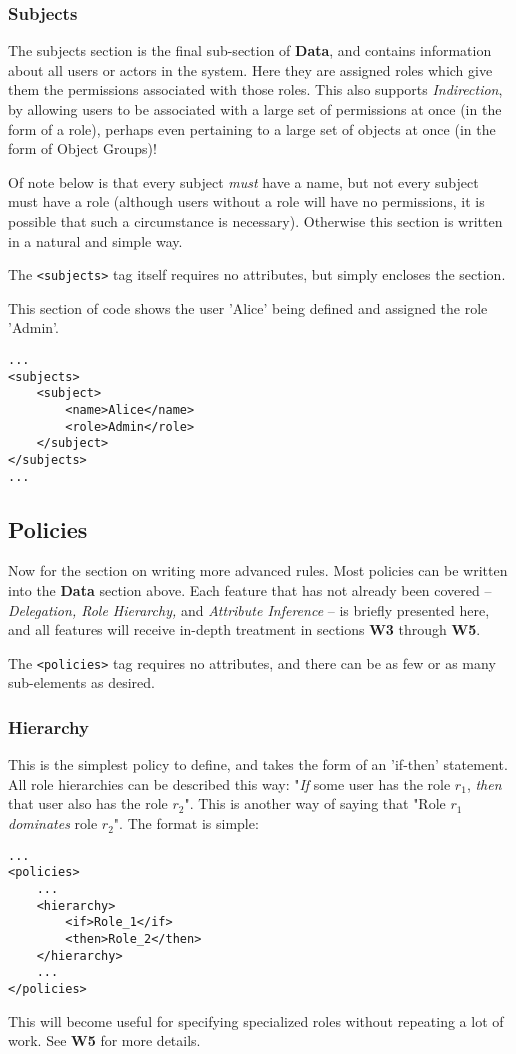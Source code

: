 \documentclass{article}
\providecommand{\inlinecode}{\texttt}
\begin{document}
\subsubsection{Subjects}
The subjects section is the final sub-section of \textbf{Data}, and contains information about all users or actors in the system. Here they are assigned roles which give them the permissions associated with those roles.
This also supports \textit{Indirection}, by allowing users to be associated with a large set of permissions at once (in the form of a role), perhaps even pertaining to a large set of objects at once (in the form of Object Groups)! \par
Of note below is that every subject \textit{must} have a name, but not every subject must have a role (although users without a role will have no permissions, it is possible that such a circumstance is necessary). Otherwise this section is written in a natural and simple way. \par
The \inlinecode{<subjects>} tag itself requires no attributes, but simply encloses the section. \par

This section of code shows the user 'Alice' being defined and assigned the role 'Admin'.
\begin{lstlisting}
...
<subjects>
    <subject>
        <name>Alice</name>
        <role>Admin</role>
    </subject>
</subjects>
...
\end{lstlisting}

\subsection{Policies}
Now for the section on writing more advanced rules. Most policies can be written into the \textbf{Data} section above.
Each feature that has not already been covered -- \textit{Delegation, Role Hierarchy,} and \textit{Attribute Inference} -- is briefly presented here, and all features will receive in-depth treatment in sections \textbf{W3} through \textbf{W5}. \par
The \inlinecode{<policies>} tag requires no attributes, and there can be as few or as many sub-elements as desired.

\subsubsection{Hierarchy}
This is the simplest policy to define, and takes the form of an 'if-then' statement. All role hierarchies can be described this way: "\textit{If} some user has the role $r_1$, \textit{then} that user also has the role $r_2$". This is another way of saying that "Role $r_1$ \textit{dominates} role $r_2$". The format is simple:
\begin{lstlisting}
...
<policies>
    ...
    <hierarchy>
        <if>Role_1</if>
        <then>Role_2</then>
    </hierarchy>
    ...
</policies>
\end{lstlisting}
This will become useful for specifying specialized roles without repeating a lot of work. See \textbf{W5} for more details.
\end{document}
